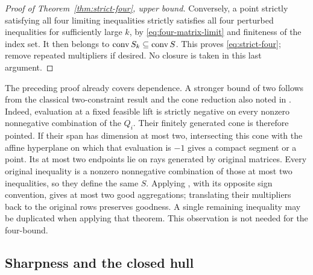 \begin{proof}[Proof of Theorem~\ref{thm:strict-four}, upper bound]
Conversely, a point strictly satisfying all four limiting inequalities
strictly satisfies all four perturbed inequalities for sufficiently
large $k$, by \eqref{eq:four-matrix-limit} and finiteness of the
index set. It then belongs to $\operatorname{conv} S_k\subseteq\operatorname{conv} S$.
This proves \eqref{eq:strict-four}; remove repeated multipliers if
desired. No closure is taken in this last argument.
\end{proof}

\begin{remark}\label{rem:dependent-four}
The preceding proof already covers dependence. A stronger bound of two
follows from the classical two-constraint result and the cone reduction
also noted in \citet[Section~2.5, after Example~2.21]{BDSpreprint}.
Indeed, evaluation at
a fixed feasible lift is strictly negative on every nonzero nonnegative
combination of the $Q_i$. Their finitely generated cone is therefore
pointed. If their span has dimension at most two, intersecting this cone
with the affine hyperplane on which that evaluation is $-1$ gives a
compact segment or a point. Its at most two endpoints lie on rays
generated by original matrices. Every original inequality is a nonzero
nonnegative combination of those at most two inequalities, so they define
the same $S$. Applying \citet[Theorem~1]{Yildiran2009}, with its
opposite sign convention, gives at most two good aggregations; translating
their multipliers back to the original rows preserves goodness. A single
remaining inequality may be duplicated when applying that theorem.
This observation is not needed for the four-bound.
\end{remark}

\subsection{Sharpness and the closed hull}


